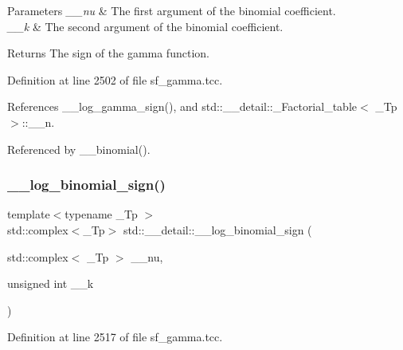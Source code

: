 \begin{DoxyParams}{Parameters}
{\em \+\_\+\+\_\+nu} & The first argument of the binomial coefficient. \\
\hline
{\em \+\_\+\+\_\+k} & The second argument of the binomial coefficient. \\
\hline
\end{DoxyParams}
\begin{DoxyReturn}{Returns}
The sign of the gamma function. 
\end{DoxyReturn}


Definition at line 2502 of file sf\+\_\+gamma.\+tcc.



References \+\_\+\+\_\+log\+\_\+gamma\+\_\+sign(), and std\+::\+\_\+\+\_\+detail\+::\+\_\+\+Factorial\+\_\+table$<$ \+\_\+\+Tp $>$\+::\+\_\+\+\_\+n.



Referenced by \+\_\+\+\_\+binomial().

\mbox{\label{namespacestd_1_1____detail_ad73e7e0dfab6a4f54af026fa3d9e9c9a}} 
\subsubsection{\texorpdfstring{\+\_\+\+\_\+log\+\_\+binomial\+\_\+sign()}{\_\_log\_binomial\_sign()}\hspace{0.1cm}{\footnotesize\ttfamily [2/2]}}
{\footnotesize\ttfamily template$<$typename \+\_\+\+Tp $>$ \\
std\+::complex$<$\+\_\+\+Tp$>$ std\+::\+\_\+\+\_\+detail\+::\+\_\+\+\_\+log\+\_\+binomial\+\_\+sign (\begin{DoxyParamCaption}\item[{std\+::complex$<$ \+\_\+\+Tp $>$}]{\+\_\+\+\_\+nu,  }\item[{unsigned int}]{\+\_\+\+\_\+k }\end{DoxyParamCaption})}



Definition at line 2517 of file sf\+\_\+gamma.\+tcc.

\mbox{\label{namespacestd_1_1____detail_ad7606a8224ac0c2256996b91051a48a5}} 
